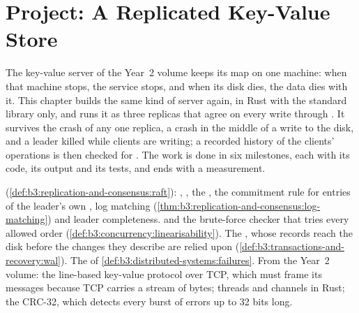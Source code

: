 \chapter{Project: A Replicated Key-Value Store}\label{ch:b3:project-replicated-store}

The key-value server of the Year~2 volume keeps its map on one machine: when that machine stops, the service stops, and when its disk dies, the data dies with it. This chapter builds the same kind of server again, in Rust with the standard library only, and runs it as three replicas that agree on every write through . It survives the crash of any one replica, a crash in the middle of a write to the disk, and a leader killed while clients are writing; a recorded history of the clients' operations is then checked for . The work is done in six milestones, each with its code, its output and its tests, and ends with a measurement.

\begin{recall}
 (\cref{def:b3:replication-and-consensus:raft}): , , the , the commitment rule for entries of the leader's own , log matching (\cref{thm:b3:replication-and-consensus:log-matching}) and leader completeness.  and the brute-force checker that tries every allowed order (\cref{def:b3:concurrency:linearisability}). The , whose records reach the disk before the changes they describe are relied upon (\cref{def:b3:transactions-and-recovery:wal}). The  of \cref{def:b3:distributed-systems:failures}. From the Year~2 volume: the line-based key-value protocol over TCP, which must frame its messages because TCP carries a stream of bytes; threads and channels in Rust; the CRC-32, which detects every burst of errors up to 32 bits long.
\end{recall}

